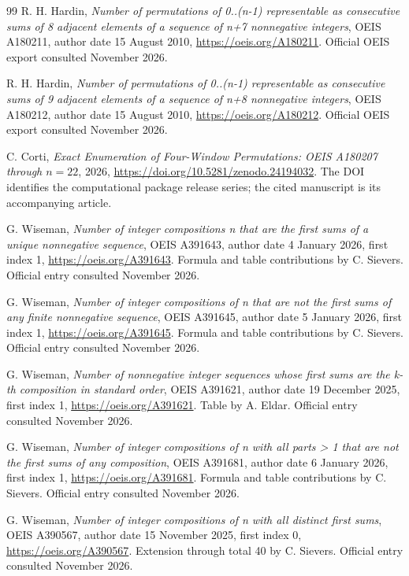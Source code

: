 \documentclass[11pt]{article}
\theoremstyle{definition}
\theoremstyle{remark}
\begin{document}
\begin{thebibliography}{99}
R. H. Hardin,
\emph{Number of permutations of 0..(n-1) representable as consecutive sums of 8 adjacent elements of a sequence of n+7 nonnegative integers},
OEIS A180211, author date 15 August 2010,
\url{https://oeis.org/A180211}.
Official OEIS export consulted November 2026.

R. H. Hardin,
\emph{Number of permutations of 0..(n-1) representable as consecutive sums of 9 adjacent elements of a sequence of n+8 nonnegative integers},
OEIS A180212, author date 15 August 2010,
\url{https://oeis.org/A180212}.
Official OEIS export consulted November 2026.

C. Corti,
\emph{Exact Enumeration of Four-Window Permutations: OEIS A180207 through
$n=22$}, 2026,
\url{https://doi.org/10.5281/zenodo.24194032}.
The DOI identifies the computational package release series; the cited
manuscript is its accompanying article.

G. Wiseman,
\emph{Number of integer compositions n that are the first sums of a unique nonnegative sequence},
OEIS A391643, author date 4 January 2026, first index 1,
\url{https://oeis.org/A391643}.
Formula and table contributions by C. Sievers. Official entry consulted November 2026.

G. Wiseman,
\emph{Number of integer compositions of n that are not the first sums of any finite nonnegative sequence},
OEIS A391645, author date 5 January 2026, first index 1,
\url{https://oeis.org/A391645}.
Formula and table contributions by C. Sievers. Official entry consulted November 2026.

G. Wiseman,
\emph{Number of nonnegative integer sequences whose first sums are the k-th composition in standard order},
OEIS A391621, author date 19 December 2025, first index 1,
\url{https://oeis.org/A391621}.
Table by A. Eldar. Official entry consulted November 2026.

G. Wiseman,
\emph{Number of integer compositions of n with all parts > 1 that are not the first sums of any composition},
OEIS A391681, author date 6 January 2026, first index 1,
\url{https://oeis.org/A391681}.
Formula and table contributions by C. Sievers. Official entry consulted November 2026.

G. Wiseman,
\emph{Number of integer compositions of n with all distinct first sums},
OEIS A390567, author date 15 November 2025, first index 0,
\url{https://oeis.org/A390567}.
Extension through total 40 by C. Sievers. Official entry consulted November 2026.


\end{thebibliography}
\end{document}
